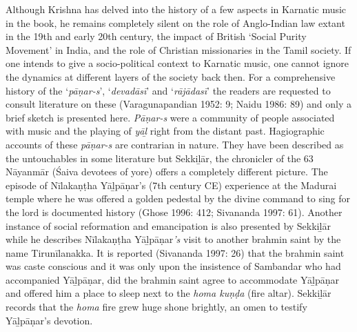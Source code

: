 Although Krishna has delved into the history of a few aspects in Karnatic music in the book, he remains completely silent on the role of Anglo-Indian law extant in the 19th and early 20th century, the impact of British ‘Social Purity Movement’ in India, and the role of Christian missionaries in the Tamil society. If one intends to give a socio-political context to Karnatic music, one cannot ignore the dynamics at different layers of the society back then. For a comprehensive history of the ‘\textit{pāṇar-s}’, ‘\textit{devadāsī}’ and ‘\textit{rājādasī}’ the readers are requested to consult literature on these (Varagunapandian 1952: 9; Naidu 1986: 89) and only a brief sketch is presented here. \textit{Pāṇar-s} were a community of people associated with music and the playing of \textit{yāḻ} right from the distant past. Hagiographic accounts of these \textit{pāṇar-s} are contrarian in nature. They have been described as the untouchables in some literature but Sekkiḻār, the chronicler of the 63 Nāyanmār (Śaiva devotees of yore) offers a completely different picture. The episode of Nīlakaṇṭha Yāḻpāṇar’s (7th century CE) experience at the Madurai temple where he was offered a golden pedestal by the divine command to sing for the lord is documented history (Ghose 1996: 412; Sivananda 1997: 61). Another instance of social reformation and emancipation is also presented by Sekkiḻār while he describes Nīlakaṇṭha Yāḻpāṇar\textit{’s} visit to another brahmin saint by the name Tirunīlanakka. It is reported (Sivananda 1997: 26) that the brahmin saint was caste conscious and it was only upon the insistence of Sambandar who had accompanied Yāḻpāṇar, did the brahmin saint agree to accommodate Yāḻpāṇar and offered him a place to sleep next to the \textit{homa kuṇḍa} (fire altar). Sekkiḻār records that the \textit{homa} fire grew huge shone brightly, an omen to testify Yāḻpāṇar’s devotion.


